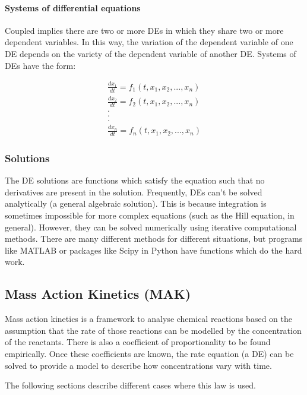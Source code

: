 \documentclass[11pt, letterpaper, english]{article}
\begin{document}
    \paragraph{Systems of differential equations }
    
    \par{Coupled implies there are two or more DEs in which they share two or more dependent variables. In this way, the variation of the dependent variable of one DE depends on the variety of the dependent variable of another DE. Systems of DEs have the form: }

    \begin{equation}
    \begin{split}
    \frac{d x_1}{dt}=f_1(t,x_1,x_2,...,x_n)\\
    \frac{d x_2}{dt}=f_2(t,x_1,x_2,...,x_n)\\
    . \\
    . \\
    . \\ 
    \frac{d x_n}{dt}=f_n(t,x_1,x_2,...,x_n)
    \end{split}
    \end{equation}

    \subsubsection{Solutions}
    
    \par{The DE solutions are functions which satisfy the equation such that no derivatives are present in the solution. Frequently, DEs can’t be solved analytically (a general algebraic solution). This is because integration is sometimes impossible for more complex equations (such as the Hill equation, in general). However, they can be solved numerically using iterative computational methods. There are many different methods for different situations, but programs like MATLAB or packages like Scipy in Python have functions which do the hard work.}

    \subsection{Mass Action Kinetics (MAK)}
    
    \par{Mass action kinetics is a framework to analyse chemical reactions based on the assumption that the rate of those reactions can be modelled by the concentration of the reactants. There is also a coefficient of proportionality to be found empirically. Once these coefficients are known, the rate equation (a DE) can be solved to provide a model to describe how concentrations vary with time.}
    \par{The following sections describe different cases where this law is used.}
    
\end{document}
